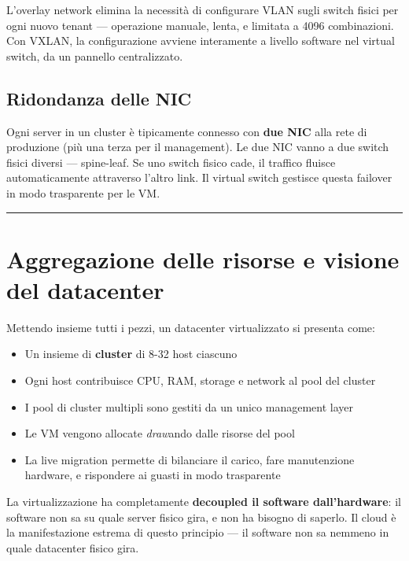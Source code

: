 \documentclass[
  italian,
  openany]{book}
\providecommand{\tightlist}{%
  \setlength{\itemsep}{0pt}\setlength{\parskip}{0pt}}
\begin{document}
L'overlay network elimina la necessità di configurare VLAN sugli switch
fisici per ogni nuovo tenant --- operazione manuale, lenta, e limitata a
4096 combinazioni. Con VXLAN, la configurazione avviene interamente a
livello software nel virtual switch, da un pannello centralizzato.

\subsection{Ridondanza delle NIC}\label{ridondanza-delle-nic}

Ogni server in un cluster è tipicamente connesso con \textbf{due NIC}
alla rete di produzione (più una terza per il management). Le due NIC
vanno a due switch fisici diversi --- spine-leaf. Se uno switch fisico
cade, il traffico fluisce automaticamente attraverso l'altro link. Il
virtual switch gestisce questa failover in modo trasparente per le VM.

\begin{center}\rule{0.5\linewidth}{0.5pt}\end{center}

\section{Aggregazione delle risorse e visione del
datacenter}\label{aggregazione-delle-risorse-e-visione-del-datacenter}

Mettendo insieme tutti i pezzi, un datacenter virtualizzato si presenta
come:

\begin{itemize}
\tightlist
\item
  Un insieme di \textbf{cluster} di 8-32 host ciascuno
\item
  Ogni host contribuisce CPU, RAM, storage e network al pool del cluster
\item
  I pool di cluster multipli sono gestiti da un unico management layer
\item
  Le VM vengono allocate \emph{draw}ando dalle risorse del pool
\item
  La live migration permette di bilanciare il carico, fare manutenzione
  hardware, e rispondere ai guasti in modo trasparente
\end{itemize}

La virtualizzazione ha completamente \textbf{decoupled il software
dall'hardware}: il software non sa su quale server fisico gira, e non ha
bisogno di saperlo. Il cloud è la manifestazione estrema di questo
principio --- il software non sa nemmeno in quale datacenter fisico
gira.
\end{document}
